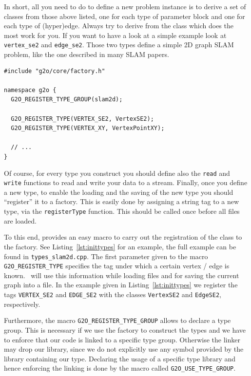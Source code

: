 \documentclass[a4paper]{article}
\begin{document}
In short, all you need to do to define a new problem instance is to
derive a set of classes from those above listed, one for each type of
parameter block and one for each type of (hyper)edge. Always try to
derive from the class which does the most work for you.  If you want to
have a look at a simple example look at \verb+vertex_se2+ and
\verb+edge_se2+. Those two types define a simple 2D graph SLAM
problem, like the one described in many SLAM papers.

\begin{lstlisting}[float,label=lst:inittypes,caption=Registering types
  by a constructor from a library]
#include "g2o/core/factory.h"

namespace g2o {
  G2O_REGISTER_TYPE_GROUP(slam2d);

  G2O_REGISTER_TYPE(VERTEX_SE2, VertexSE2);
  G2O_REGISTER_TYPE(VERTEX_XY, VertexPointXY);

  // ...
}
\end{lstlisting}

Of course, for every type you construct you should define also the
\verb+read+ and \verb+write+ functions to read and write your data to a
stream.  Finally, once you define a new type, to enable the loading and
the saving of the new type you should ``register'' it to a factory.
This is easily done by assigning a string tag to a new type, via the
\verb+registerType+ function. This should be called once before
all files are loaded.

To this end, \gopt{} provides an easy macro to carry out the registration of the
class to the factory.  See Listing~\ref{lst:inittypes} for an example,
the full example can be found in \verb+types_slam2d.cpp+.  The first
parameter given to the macro \verb+G2O_REGISTER_TYPE+ specifies the tag
under which a certain vertex / edge is known. \gopt\ will use this
information while loading files and for saving the current graph into a
file. In the example given in Listing~\ref{lst:inittypes} we register
the tags \verb+VERTEX_SE2+ and \verb+EDGE_SE2+ with the classes
\verb+VertexSE2+ and \verb+EdgeSE2+, respectively.

Furthermore, the macro \verb+G2O_REGISTER_TYPE_GROUP+ allows to declare
a type group. This is necessary if we use the factory to construct the
types and we have to enforce that our code is linked to a specific type
group. Otherwise the linker may drop our library, since we do not
explicitly use any symbol provided by the library containing our type.
Declaring the usage of a specific type library and hence enforcing the
linking is done by the macro called \verb+G2O_USE_TYPE_GROUP+.
\end{document}
